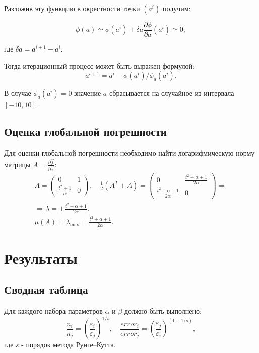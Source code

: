 \documentclass[a4paper,12pt]{article}
\begin{document}
Разложив эту функцию в окрестности точки \((a^{i})\) получим:

\begin{equation*}
  \phi(a)\simeq\phi(a^{i})+\delta a\frac{\partial \phi}{\partial a}(a^{i})\simeq0,
\end{equation*}

где \(\delta a=a^{i+1}-a^{i}\). 

Тогда итерационный процесс может быть выражен формулой:
\begin{equation*}
  a^{i+1}=a^{i}-\phi(a^{i}) / \phi_a(a^{i}).
\end{equation*}

В случае \(\phi_a(a^{i})=0\) значение \(a\) сбрасывается на случайное из интервала \([-10, 10]\).

\subsection*{Оценка глобальной погрешности}
Для оценки глобальной погрешности необходимо найти логарифмическую норму матрицы \(A=\frac{\partial \vec{f}}{\partial \vec{x}}\):
\begin{gather*}
  A=\begin{pmatrix}
    0                    & 1  \\
    \frac{t^2+1}{\alpha} & 0
  \end{pmatrix}, \quad \frac{1}{2}\left(A^T+A\right)=\begin{pmatrix}
    0                            & \frac{t^2+\alpha+1}{2\alpha} \\
    \frac{t^2+\alpha+1}{2\alpha} & 0
  \end{pmatrix}\Rightarrow\\
  \Rightarrow \lambda=\pm\frac{t^2+\alpha+1}{2\alpha}.\\
  \mu(A) = \lambda_{\max}=\frac{t^2+\alpha+1}{2\alpha}.
\end{gather*}

\section*{Результаты}

\subsection*{Сводная таблица}

Для каждого набора параметров \(\alpha\) и \(\beta\) должно быть выполнено:
\begin{equation*}
  \frac{n_{i}}{n_{j}}=\left(\frac{\varepsilon_{i}}{\varepsilon_{j}}\right)^{1/s}, \quad \frac{error_{i}}{error_{j}}=\left(\frac{\varepsilon_{j}}{\varepsilon_{i}}\right)^{(1-1/s)},
\end{equation*}
где \(s\) - порядок метода Рунге--Кутта.
\end{document}
